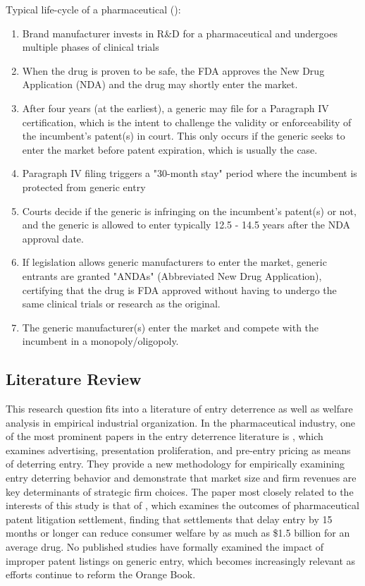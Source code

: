\documentclass[12pt,a4paper]{article}
\begin{document}
Typical life-cycle of a pharmaceutical (\cite{kannapan2021}):
\begin{enumerate}
    \item Brand manufacturer invests in R\&D for a pharmaceutical and undergoes multiple phases of clinical trials
    \item When the drug is proven to be safe, the FDA approves the New Drug Application (NDA) and the drug may shortly enter the market.
    \item After four years (at the earliest), a generic may file for a Paragraph IV certification, which is the intent to challenge the validity or enforceability of the incumbent's patent(s) in court. This only occurs if the generic seeks to enter the market before patent expiration, which is usually the case.
    \item Paragraph IV filing triggers a "30-month stay" period where the incumbent is protected from generic entry
    \item Courts decide if the generic is infringing on the incumbent's patent(s) or not, and the generic is allowed to enter typically 12.5 - 14.5 years after the NDA approval date.
    \item If legislation allows generic manufacturers to enter the market, generic entrants are granted "ANDAs" (Abbreviated New Drug Application), certifying that the drug is FDA approved without having to undergo the same clinical trials or research as the original.
    \item The generic manufacturer(s) enter the market and compete with the incumbent in a monopoly/oligopoly.
\end{enumerate}

\subsection{Literature Review}

This research question fits into a literature of entry deterrence as well as welfare analysis in empirical industrial organization. In the pharmaceutical industry, one of the most prominent papers in the entry deterrence literature is \cite{ellison2011}, which examines advertising, presentation proliferation, and pre-entry pricing as means of deterring entry. They provide a new methodology for empirically examining entry deterring behavior and demonstrate that market size and firm revenues are key determinants of strategic firm choices. The paper most closely related to the interests of this study is that of \cite{woodcock2016}, which examines the outcomes of pharmaceutical patent litigation settlement, finding that settlements that delay entry by 15 months or longer can reduce consumer welfare by as much as \$1.5 billion for an average drug. No published studies have formally examined the impact of improper patent listings on generic entry, which becomes increasingly relevant as efforts continue to reform the Orange Book.
\end{document}
